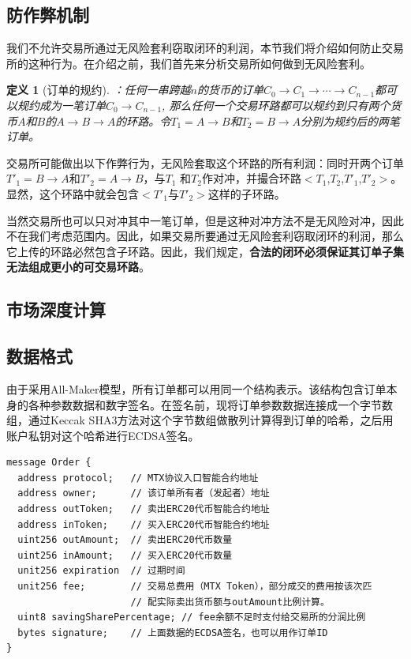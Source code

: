 \documentclass[UTF8,nofonts]{ctexart}
\newtheorem{definition}{定义}[section]
\begin{document}
\subsection{防作弊机制}
我们不允许交易所通过无风险套利窃取闭环的利润，本节我们将介绍如何防止交易所的这种行为。在介绍之前，我们首先来分析交易所如何做到无风险套利。
\begin{definition}[订单的规约]：任何一串跨越$n$的货币的订单$C_{0}\rightarrow C_{1}\rightarrow \cdots \rightarrow C_{n-1}$都可以规约成为一笔订单$C_{0} \rightarrow C_{n-1}$, 那么任何一个交易环路都可以规约到只有两个货币$A$和$B$的$A\rightarrow B\rightarrow A$的环路。令$T_{1} = A\rightarrow B$和$T_{2} = B\rightarrow A$分别为规约后的两笔订单。
\end{definition}

交易所可能做出以下作弊行为，无风险套取这个环路的所有利润：同时开两个订单$T'_{1} = B\rightarrow A$和$T'_{2} = A\rightarrow B$，与$T_{1}$ 和$T_{2}$作对冲，并撮合环路$<T_{1}$,$T_{2}$,$T'_{1}$,$T'_{2}>$。显然，这个环路中就会包含$<T'_{1}$与$T'_{2}>$这样的子环路。

当然交易所也可以只对冲其中一笔订单，但是这种对冲方法不是无风险对冲，因此不在我们考虑范围内。因此，如果交易所要通过无风险套利窃取闭环的利润，那么它上传的环路必然包含子环路。因此，我们规定，{\bfseries 合法的闭环必须保证其订单子集无法组成更小的可交易环路}。


\subsection{市场深度计算\label{sec:pricemodel}}

\subsection{数据格式\label{sec:dataformat}}

由于采用All-Maker模型，所有订单都可以用同一个结构表示。该结构包含订单本身的各种参数数据和数字签名。在签名前，现将订单参数数据连接成一个字节数组，通过Keccak SHA3方法对这个字节数组做散列计算得到订单的哈希，之后用账户私钥对这个哈希进行ECDSA签名。


\begin{verbatim}
message Order {
  address protocol;   // MTX协议入口智能合约地址
  address owner;      // 该订单所有者（发起者）地址
  address outToken;   // 卖出ERC20代币智能合约地址
  address inToken;    // 买入ERC20代币智能合约地址
  uint256 outAmount;  // 卖出ERC20代币数量
  uint256 inAmount;   // 买入ERC20代币数量
  unit256 expiration  // 过期时间
  unit256 fee;        // 交易总费用（MTX Token），部分成交的费用按该次匹
                      // 配实际卖出货币额与outAmount比例计算。
  uint8 savingSharePercentage; // fee余额不足时支付给交易所的分润比例
  bytes signature;    // 上面数据的ECDSA签名，也可以用作订单ID
}	
\end{verbatim}
\end{document}

